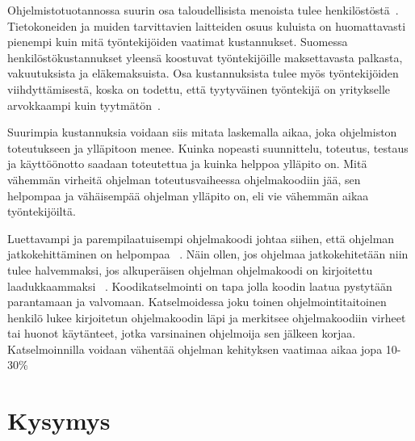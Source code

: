 \documentclass[finnish]{tktltiki2}
\theoremstyle{definition}
\theoremstyle{remark}
\begin{document}
Ohjelmistotuotannossa suurin osa taloudellisista menoista tulee henkilöstöstä~\cite{haikala1995ohjelmistotuotanto}. Tietokoneiden ja muiden tarvittavien laitteiden osuus kuluista on huomattavasti pienempi kuin mitä työntekijöiden vaatimat kustannukset. Suomessa henkilöstökustannukset yleensä koostuvat työntekijöille maksettavasta palkasta, vakuutuksista ja eläkemaksuista. Osa kustannuksista tulee myös työntekijöiden viihdyttämisestä, koska on todettu, että tyytyväinen työntekijä on yritykselle arvokkaampi kuin tyytmätön~\cite{airo2008oma}.

Suurimpia kustannuksia voidaan siis mitata laskemalla aikaa, joka ohjelmiston toteutukseen ja ylläpitoon menee. Kuinka nopeasti suunnittelu, toteutus, testaus ja käyttöönotto saadaan toteutettua ja kuinka helppoa ylläpito on.  Mitä vähemmän virheitä ohjelman toteutusvaiheessa ohjelmakoodiin jää, sen helpompaa ja vähäisempää ohjelman ylläpito on, eli vie vähemmän aikaa työntekijöiltä.

Luettavampi ja parempilaatuisempi ohjelmakoodi johtaa siihen, että ohjelman jatkokehittäminen on helpompaa ~\cite{johnson1994instrumented}. Näin ollen, jos ohjelmaa jatkokehitetään niin tulee halvemmaksi, jos alkuperäisen ohjelman ohjelmakoodi on kirjoitettu laadukkaammaksi ~\cite{fagan2001design}. Koodikatselmointi on tapa jolla koodin laatua pystytään parantamaan ja valvomaan. Katselmoidessa joku toinen ohjelmointitaitoinen henkilö lukee kirjoitetun ohjelmakoodin läpi ja merkitsee ohjelmakoodiin virheet tai huonot käytänteet, jotka varsinainen ohjelmoija sen jälkeen korjaa. Katselmoinnilla voidaan vähentää ohjelman kehityksen vaatimaa aikaa jopa 10-30\%~\cite{gilb1993software}


\section{Kysymys}
\end{document}
